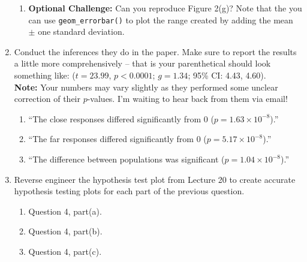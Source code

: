 \documentclass{article}\usepackage[]{graphicx}\usepackage[]{xcolor}
\begin{document}
\begin{enumerate}
\begin{enumerate}
  \item \textbf{Optional Challenge:} Can you reproduce Figure 2(g)?
  Note that the you can use \texttt{geom\_errorbar()} to plot
  the range created by adding the mean $\pm$ one standard deviation.
\end{enumerate}
\item Conduct the inferences they do in the paper. Make sure to report the results
a little more comprehensively -- that is your parenthetical should look something
like: ($t=23.99$, $p<0.0001$; $g=1.34$; 95\% CI: 4.43, 4.60).\\
\textbf{Note:} Your numbers may vary slightly as they performed some unclear
correction of their $p$-values. I'm waiting to hear back from them via email!
\begin{enumerate}
  \item ``The close responses differed significantly from 0 ($p=1.63 \times 10^{-8}$).''
  \item ``The far responses differed significantly from 0 ($p=5.17 \times 10^{-8}$).''
  \item ``The difference between populations was significant ($p=1.04 \times10^{-8}$).''
\end{enumerate}
\item Reverse engineer the hypothesis test plot from Lecture 20 to create accurate
hypothesis testing plots for each part of the previous question.
\begin{enumerate}
  \item Question 4, part(a).
  \item Question 4, part(b).
  \item Question 4, part(c).
\end{enumerate}
\end{enumerate}



\end{document}
